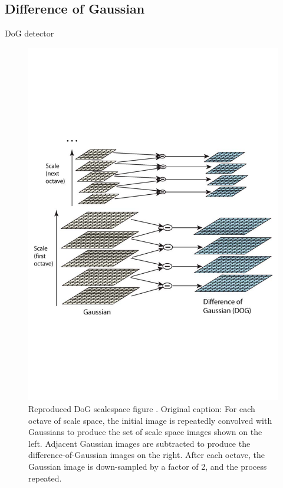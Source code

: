 \documentclass[thesis.tex]{subfiles}
\begin{document}
\subsection{Difference of Gaussian}
DoG detector

\begin{figure}[tb]
	\centering
	\includegraphics[width=\textwidth,clip=true,trim=0 200 0 220]{img/SIFT_dogspaces.pdf}
	\caption{Reproduced DoG scalespace figure \cite[figure 1,pp. 95]{lowe2004distinctive}. Original caption: For each octave of scale space, the initial image is repeatedly convolved with Gaussians to produce the set of scale space images
shown on the left. Adjacent Gaussian images are subtracted to produce the difference-of-Gaussian images on the right. After each octave, the
Gaussian image is down-sampled by a factor of 2, and the process repeated.}
	\label{fig:dogSpaces}
\end{figure}
\end{document}
